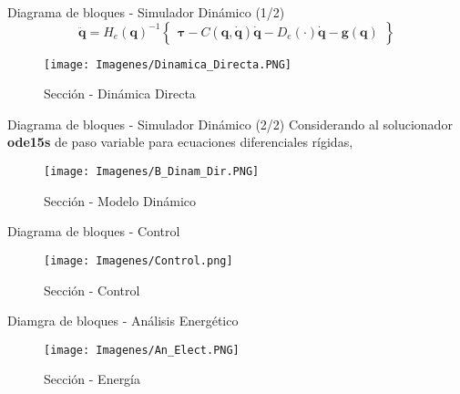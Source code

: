 \begin{frame}{Diagrama de bloques - Simulador Dinámico (1/2)}
    \begin{equation}
        \label{eqn:modelo_simulink}
            \boldsymbol{\ddot{q}} =H_e(\boldsymbol{q})^{-1} \begin{Bmatrix}
                \boldsymbol{\boldsymbol{\tau}} - C(\boldsymbol{q}, \boldsymbol{\dot{q}}) \boldsymbol{\dot{q}}
                        - D_e(\cdot)\boldsymbol{\dot{q}} - \boldsymbol{g}(\boldsymbol{q})
            \end{Bmatrix}
    \end{equation}
    
    \begin{figure}[htpb]
        \begin{center}
            \texttt{[image: Imagenes/Dinamica\_Directa.PNG]}
            \caption{Sección - Dinámica Directa}
        \end{center}
    \end{figure}
\end{frame}

\begin{frame}{Diagrama de bloques - Simulador Dinámico (2/2)}
    Considerando al solucionador \textbf{ode15s} de paso variable para ecuaciones diferenciales rígidas,
    \begin{figure}[htpb]
        \begin{center}
            \texttt{[image: Imagenes/B\_Dinam\_Dir.PNG]}
            \caption{Sección - Modelo Dinámico}
        \end{center}
    \end{figure}
\end{frame}

\begin{frame}{Diagrama de bloques - Control}
    \begin{figure}[htpb]
        \begin{center}
            \texttt{[image: Imagenes/Control.png]}
            \caption{Sección - Control}
        \end{center}
    \end{figure}
\end{frame}

\begin{frame}{Diamgra de bloques - Análisis Energético}
    \begin{figure}[htpb]
        \begin{center}
            \texttt{[image: Imagenes/An\_Elect.PNG]}
            \caption{Sección - Energía}
        \end{center}
    \end{figure}
\end{frame}
